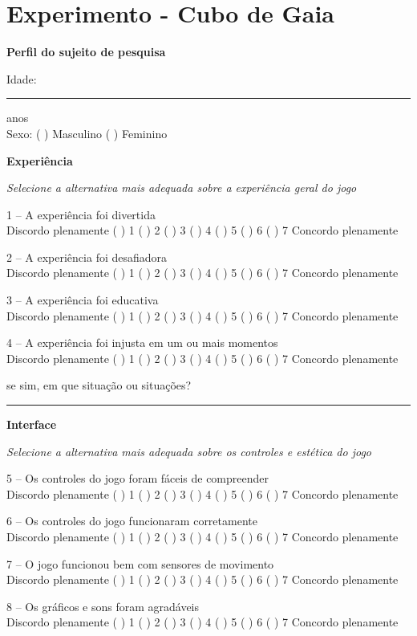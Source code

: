\chapter{Experimento - Cubo de Gaia} \label{apendice:questionario}
\noindent
\setlength{\parindent}{0pt}

\textbf{Perfil do sujeito de pesquisa}

Idade: \noindent\rule{1.5cm}{0.4pt} anos \\
Sexo: ( ) Masculino ( ) Feminino

\textbf{Experiência}

\textit{Selecione a alternativa mais adequada sobre a experiência geral do jogo}

1 – A experiência foi divertida \\
Discordo plenamente ( ) 1 ( ) 2 ( ) 3 ( ) 4 ( ) 5 ( ) 6 ( ) 7 Concordo plenamente

2 – A experiência foi desafiadora \\
Discordo plenamente ( ) 1 ( ) 2 ( ) 3 ( ) 4 ( ) 5 ( ) 6 ( ) 7 Concordo plenamente

3 – A experiência foi educativa \\
Discordo plenamente ( ) 1 ( ) 2 ( ) 3 ( ) 4 ( ) 5 ( ) 6 ( ) 7 Concordo plenamente

4 – A experiência foi injusta em um ou mais momentos \\
Discordo plenamente ( ) 1 ( ) 2 ( ) 3 ( ) 4 ( ) 5 ( ) 6 ( ) 7 Concordo plenamente

se sim, em que situação ou situações?

\rule{\linewidth-\marginparwidth}{0.4pt}


\textbf{Interface}

\textit{Selecione a alternativa mais adequada sobre os controles e estética do jogo}

5 – Os controles do jogo foram fáceis de compreender \\
Discordo plenamente ( ) 1 ( ) 2 ( ) 3 ( ) 4 ( ) 5 ( ) 6 ( ) 7 Concordo plenamente

6 – Os controles do jogo funcionaram corretamente \\
Discordo plenamente ( ) 1 ( ) 2 ( ) 3 ( ) 4 ( ) 5 ( ) 6 ( ) 7 Concordo plenamente

7 – O jogo funcionou bem com sensores de movimento \\
Discordo plenamente ( ) 1 ( ) 2 ( ) 3 ( ) 4 ( ) 5 ( ) 6 ( ) 7 Concordo plenamente

8 – Os gráficos e sons foram agradáveis \\
Discordo plenamente ( ) 1 ( ) 2 ( ) 3 ( ) 4 ( ) 5 ( ) 6 ( ) 7 Concordo plenamente

